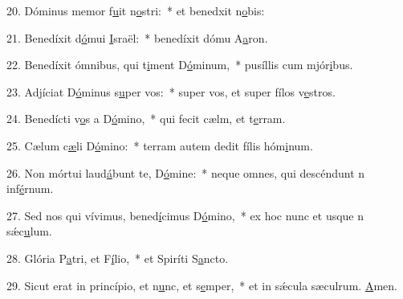 20. Dóminus memor f\uline{u}it n\uline{o}stri:~* et benedxit n\uline{o}bis:\par 
21. Benedíxit d\uline{ó}mui \uline{I}sraël:~* benedíxit dómu A\uline{a}ron.\par 
22. Benedíxit ómnibus, qui t\uline{i}ment D\uline{ó}minum,~* pusíllis cum mjór\uline{i}bus.\par 
23. Adjíciat D\uline{ó}minus s\uline{u}per vos:~* super vos, et super fílos v\uline{e}stros.\par 
24. Benedícti v\uline{o}s a D\uline{ó}mino,~* qui fecit cælm, et t\uline{e}rram.\par 
25. Cælum c\uline{æ}li D\uline{ó}mino:~* terram autem dedit fílis hóm\uline{i}num.\par 
26. Non mórtui laud\uline{á}bunt te, D\uline{ó}mine:~* neque omnes, qui descéndunt n inf\uline{é}rnum.\par 
27. Sed nos qui vívimus, bened\uline{í}cimus D\uline{ó}mino,~* ex hoc nunc et usque n sǽc\uline{u}lum.\par 
28. Glória P\uline{a}tri, et F\uline{í}lio,~* et Spiríti S\uline{a}ncto.\par 
29. Sicut erat in princípio, et n\uline{u}nc, et s\uline{e}mper,~* et in sǽcula sæculrum. \uline{A}men.\par 
